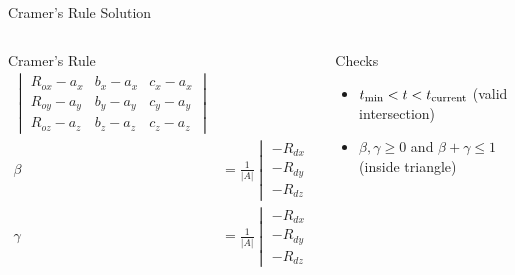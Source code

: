 \begin{frame}{Cramer's Rule Solution}
\begin{columns}
\begin{column}{0.6\textwidth}
\begin{mathbox}{Cramer's Rule}
\begin{align*}
\begin{vmatrix}
                        R_{ox}-a_x & b_x-a_x & c_x-a_x \\
                        R_{oy}-a_y & b_y-a_y & c_y-a_y \\
                        R_{oz}-a_z & b_z-a_z & c_z-a_z
                    \end{vmatrix} \\
                    \beta &= \frac{1}{|A|} \begin{vmatrix}
                        -R_{dx} & R_{ox}-a_x & c_x-a_x \\
                        -R_{dy} & R_{oy}-a_y & c_y-a_y \\
                        -R_{dz} & R_{oz}-a_z & c_z-a_z
                    \end{vmatrix} \\
                    \gamma &= \frac{1}{|A|} \begin{vmatrix}
                        -R_{dx} & b_x-a_x & R_{ox}-a_x \\
                        -R_{dy} & b_y-a_y & R_{oy}-a_y \\
                        -R_{dz} & b_z-a_z & R_{oz}-a_z
                    \end{vmatrix}
                \end{align*}
            \end{mathbox}
        \end{column}
        \pause
        \begin{column}{0.4\textwidth}
            \begin{conceptbox}{Checks}
                \footnotesize
                \begin{itemize}
                    \item $t_{\text{\text{min}}} < t < t_{\text{\text{current}}}$ (valid intersection)
                    \item $\beta, \gamma \geq 0$ and $\beta + \gamma \leq 1$ \\ (inside triangle)
                \end{itemize}
            \end{conceptbox}
        \end{column}
    \end{columns}
\end{frame}

% 


